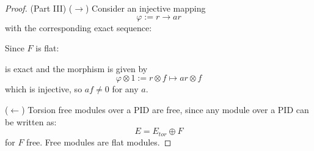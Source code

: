 \documentclass{article}
\begin{document}
\begin{proof}
        (Part III) ($\rightarrow$) Consider an injective mapping 
            \begin{equation*}
                \varphi:= r \rightarrow ar
            \end{equation*}
        with the corresponding exact sequence:
            \begin{center}
            \end{center}
        Since $F$ is flat:
            \begin{center}
            \end{center}
        is exact and the morphism is given by
            \begin{equation*}
                \varphi \otimes 1 := r \otimes f \mapsto ar \otimes f
            \end{equation*}
        which is injective, so $af \neq 0$ for any $a$.

        ($\leftarrow$) Torsion free modules over a PID are free, since any module over a PID can be written as:
            \begin{equation*}
                E = E_{tor} \oplus F
            \end{equation*}
        for $F$ free. Free modules are flat modules.
    \end{proof}
\end{document}
